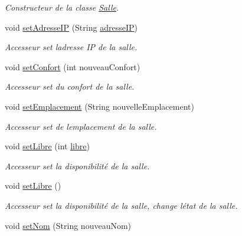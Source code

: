 \begin{DoxyCompactItemize}
\begin{DoxyCompactList}\small\item\em Constructeur de la classe \hyperlink{classcom_1_1lasalle_1_1meeting_1_1_salle}{Salle}. \end{DoxyCompactList}\item 
void \hyperlink{classcom_1_1lasalle_1_1meeting_1_1_salle_a87125e2e3060bc3d1582dafbdef7b65e}{set\+Adresse\+IP} (String \hyperlink{classcom_1_1lasalle_1_1meeting_1_1_salle_ad83f4f49123c8d02f2fc0da484d3e812}{adresse\+IP})
\begin{DoxyCompactList}\small\item\em Accesseur set l\textquotesingle{}adresse IP de la salle. \end{DoxyCompactList}\item 
void \hyperlink{classcom_1_1lasalle_1_1meeting_1_1_salle_a30986392165b34765e4325f669cc5ece}{set\+Confort} (int nouveau\+Confort)
\begin{DoxyCompactList}\small\item\em Accesseur set du confort de la salle. \end{DoxyCompactList}\item 
void \hyperlink{classcom_1_1lasalle_1_1meeting_1_1_salle_aaa826cdcf54f561daf439c2bf84de5eb}{set\+Emplacement} (String nouvelle\+Emplacement)
\begin{DoxyCompactList}\small\item\em Accesseur set de l\textquotesingle{}emplacement de la salle. \end{DoxyCompactList}\item 
void \hyperlink{classcom_1_1lasalle_1_1meeting_1_1_salle_a94c64624d647ec3ec60a9fbeb06948b8}{set\+Libre} (int \hyperlink{classcom_1_1lasalle_1_1meeting_1_1_salle_a2965cb92b06dcdd28a07fa550259b1c1}{libre})
\begin{DoxyCompactList}\small\item\em Accesseur set la disponibilité de la salle. \end{DoxyCompactList}\item 
void \hyperlink{classcom_1_1lasalle_1_1meeting_1_1_salle_af48c38974e65f48082db016a82afaf89}{set\+Libre} ()
\begin{DoxyCompactList}\small\item\em Accesseur set la disponibilité de la salle, change l\textquotesingle{}état de la salle. \end{DoxyCompactList}\item 
void \hyperlink{classcom_1_1lasalle_1_1meeting_1_1_salle_aad311d55fc41f798532a8a30ea1b68f0}{set\+Nom} (String nouveau\+Nom)

\end{DoxyCompactItemize}

